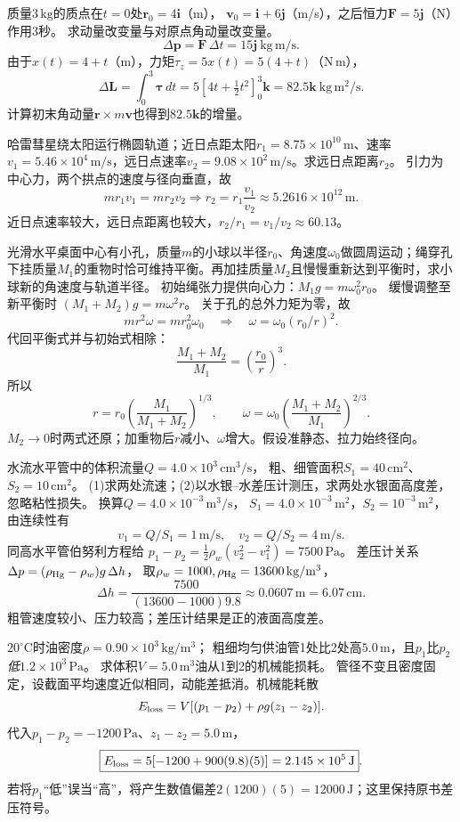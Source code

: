 \problemtext 质量$3\,\mathrm{kg}$的质点在$t=0$处$\bm r_0=4\bm i$（m），
$\bm v_0=\bm i+6\bm j$（m/s），之后恒力$\bm F=5\bm j$（N）作用$3$秒。
求动量改变量与对原点角动量改变量。
\workings
\[
\boxed{\Delta\bm p=\bm F\,\Delta t=15\bm j\ \mathrm{kg\,m/s}}.
\]
由于$x(t)=4+t$（m），力矩$\tau_z=5x(t)=5(4+t)$（N\,m），
\[
\boxed{\Delta\bm L=\int_0^3\bm\tau\,dt
=5\left[4t+\tfrac12 t^2\right]_{0}^{3}\bm k
=82.5\bm k\ \mathrm{kg\,m^2/s}}.
\]
\crosscheck 计算初末角动量$\bm r\times m\bm v$也得到$82.5\bm k$的增量。

\problemtext 哈雷彗星绕太阳运行椭圆轨道；近日点距太阳$r_1=8.75\times10^{10}\,\mathrm m$、速率$v_1=5.46\times10^4\,\mathrm{m/s}$，远日点速率$v_2=9.08\times10^2\,\mathrm{m/s}$。求远日点距离$r_2$。
\workings
引力为中心力，两个拱点的速度与径向垂直，故
\[
mr_1v_1=mr_2v_2
\Longrightarrow
\boxed{r_2=r_1\frac{v_1}{v_2}
\approx5.2616\times10^{12}\,\mathrm m}.
\]
\crosscheck 近日点速率较大，远日点距离也较大，$r_2/r_1=v_1/v_2\approx60.13$。

\problemtext 光滑水平桌面中心有小孔，质量$m$的小球以半径$r_0$、角速度$\omega_0$做圆周运动；绳穿孔下挂质量$M_1$的重物时恰可维持平衡。再加挂质量$M_2$且慢慢重新达到平衡时，求小球新的角速度与轨道半径。
\workings
初始绳张力提供向心力：$M_1g=m\omega_0^2 r_0$。
缓慢调整至新平衡时
$(M_1+M_2)g=m\omega^2r$。
关于孔的总外力矩为零，故
\[
mr^2\omega=mr_0^2\omega_0
\quad\Longrightarrow\quad
\omega=\omega_0(r_0/r)^2.
\]
代回平衡式并与初始式相除：
\[
\frac{M_1+M_2}{M_1}=\left(\frac{r_0}{r}\right)^3.
\]
所以
\[
\boxed{r=r_0\left(\frac{M_1}{M_1+M_2}\right)^{1/3}},\qquad
\boxed{\omega=\omega_0\left(\frac{M_1+M_2}{M_1}\right)^{2/3}}.
\]
\crosscheck $M_2\to0$时两式还原；加重物后$r$减小、$\omega$增大。假设准静态、拉力始终径向。

\problemtext 水流水平管中的体积流量$Q=4.0\times10^3\,\mathrm{cm^3/s}$，
粗、细管面积$S_1=40\,\mathrm{cm^2}$、$S_2=10\,\mathrm{cm^2}$。
(1)求两处流速；(2)以水银--水差压计测压，求两处水银面高度差，忽略粘性损失。
\workings
换算$Q=4.0\times10^{-3}\,\mathrm{m^3/s}$，
$S_1=4.0\times10^{-3}\,\mathrm{m^2}$，$S_2=10^{-3}\,\mathrm{m^2}$，由连续性有
\[
\boxed{v_1=Q/S_1=1\,\mathrm{m/s}},\quad
\boxed{v_2=Q/S_2=4\,\mathrm{m/s}}.
\]
同高水平管伯努利方程给
$p_1-p_2=\frac12\rho_w(v_2^2-v_1^2)=7500\,\mathrm{Pa}$。
差压计关系
$\Delta p=(\rho_{\rm Hg}-\rho_w)g\,\Delta h$，
取$\rho_w=1000,\rho_{\rm Hg}=13600\,\mathrm{kg/m^3}$，
\[
\boxed{\Delta h=\frac{7500}{(13600-1000)9.8}
\approx0.0607\,\mathrm m=6.07\,\mathrm{cm}}.
\]
\crosscheck 粗管速度较小、压力较高；差压计结果是正的液面高度差。

\problemtext $20^\circ\mathrm C$时油密度$\rho=0.90\times10^3\,\mathrm{kg/m^3}$；
粗细均匀供油管1处比2处高$5.0\,\mathrm m$，且$p_1$比$p_2$\emph{低}$1.2\times10^3\,\mathrm{Pa}$。
求体积$V=5.0\,\mathrm{m^3}$油从1到2的机械能损耗。
\workings
管径不变且密度固定，设截面平均速度近似相同，动能差抵消。机械能耗散
\[
E_{\rm loss}=V[(p_1-p_2)+\rho g(z_1-z_2)].
\]
代入$p_1-p_2=-1200\,\mathrm{Pa}$、$z_1-z_2=5.0\,\mathrm m$，
\[
\boxed{E_{\rm loss}=5[-1200+900(9.8)(5)]
=2.145\times10^5\,\mathrm J}.
\]
\crosscheck 若将$p_1$“低”误当“高”，将产生数值偏差$2(1200)(5)=12000\,\mathrm J$；这里保持原书差压符号。
